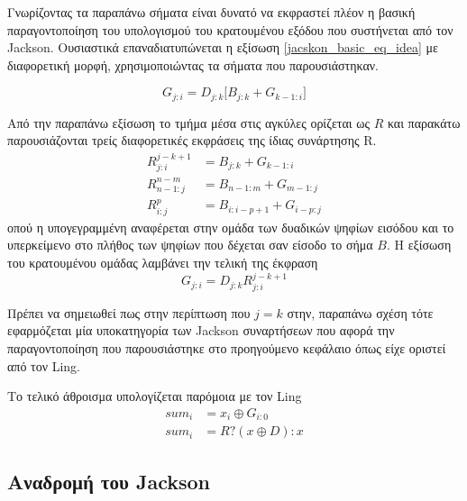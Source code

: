 Γνωρίζοντας τα παραπάνω σήματα είναι δυνατό να εκφραστεί πλέον η βασική 
παραγοντοποίηση του υπολογισμού του κρατουμένου εξόδου
που συστήνεται από τον Jackson. Ουσιαστικά επαναδιατυπώνεται η εξίσωση \ref{jacskon_basic_eq_idea} με διαφορετική μορφή, χρησιμοποιώντας τα σήματα που παρουσιάστηκαν. 

\begin{equation}
    G_{j:i} = D_{j:k} \Big[B_{j:k}+G_{k-1:i}\Big]
\end{equation}

Από την παραπάνω εξίσωση το τμήμα μέσα στις αγκύλες ορίζεται ως $R$ και παρακάτω παρουσιάζονται τρείς διαφορετικές εκφράσεις της ίδιας συνάρτησης R. 
\begin{equation}
\begin{split}
    R^{j-k+1}_{j:i} &= B_{j:k}+G_{k-1:i}\\
    R^{n-m}_{n-1:j} &= B_{n-1:m} + G_{m-1:j}\\
    R^p_{i:j} &= B_{i:i-p+1}+G_{i-p:j}  
\end{split}
\end{equation}
οπού η υπογεγραμμένη αναφέρεται στην ομάδα των
δυαδικών ψηφίων εισόδου και το υπερκείμενο στο πλήθος των ψηφίων
που δέχεται σαν είσοδο το σήμα $B$. Η εξίσωση του κρατουμένου ομάδας λαμβάνει την τελική της έκφραση
\begin{equation}
    G_{j:i} = D_{j:k} R^{j-k+1}_{j:i}
\end{equation}

Πρέπει να σημειωθεί πως στην περίπτωση που $j=k$ στην, παραπάνω σχέση 
τότε εφαρμόζεται μία υποκατηγορία των Jackson συναρτήσεων που αφορά την παραγοντοποίηση που παρουσιάστηκε στο προηγούμενο κεφάλαιο όπως είχε οριστεί από τον Ling.

Το τελικό άθροισμα υπολογίζεται παρόμοια με τον Ling
\begin{equation}
    \label{Jackson_sum_mult}
    \begin{split}
        sum_i &= x_i \oplus G_{i:0}\\
        sum_i &= R ? ( x \oplus D) : x 
    \end{split}
\end{equation}












\subsection{Αναδρομή του Jackson }

